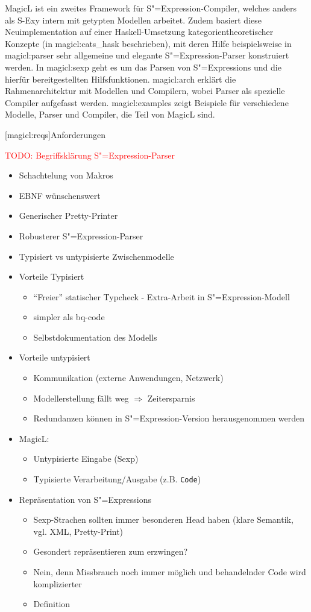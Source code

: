 \documentclass[a4paper, bibgerm]{book}
\newcommand\icode[1]{\lstinline?#1?}
\newcommand{\todo}[1]{
  \textcolor{red}{TODO: #1}
}
\newcommand\lsection{}
\newcommand\sref{}
\newcommand{\sexy}{S-Exy}
\newcommand{\sexp}{S"=Expression}
\newcommand{\sexps}{S"=Expressions}
\begin{document}
MagicL ist ein zweites Framework für \sexp-Compiler, welches anders
als \sexy{} intern mit getypten Modellen arbeitet. Zudem basiert diese
Neuimplementation auf einer Haskell-Umsetzung kategorientheoretischer
Konzepte (in \sref{magicl:cats_hask} beschrieben), mit deren Hilfe
beispielsweise in \sref{magicl:parser} sehr allgemeine und elegante
\sexp{}-Parser konstruiert werden. In \sref{magicl:sexp} geht es um
das Parsen von \sexps{} und die hierfür bereitgestellten
Hilfsfunktionen. \sref{magicl:arch} erklärt die Rahmenarchitektur mit
Modellen und Compilern, wobei Parser als spezielle Compiler aufgefasst
werden. \sref{magicl:examples} zeigt Beispiele für verschiedene
Modelle, Parser und Compiler, die Teil von MagicL sind.

\lsection[magicl:reqs]{Anforderungen}

\todo{Begriffsklärung \sexp{}-Parser}

\begin{itemize}
\item Schachtelung von Makros
\item EBNF wünschenswert
\item Generischer Pretty-Printer
\item Robusterer \sexp-{Parser} 
\item Typisiert vs untypisierte Zwischenmodelle
\item Vorteile Typisiert
  \begin{itemize}
  \item "`Freier"' statischer Typcheck - Extra-Arbeit in \sexp{}-Modell
  \item simpler als bq-code
  \item Selbstdokumentation des Modells
  \end{itemize}
\item Vorteile untypisiert
  \begin{itemize}
  \item Kommunikation (externe Anwendungen, Netzwerk)
  \item Modellerstellung fällt weg $\Rightarrow$ Zeitersparnis
  \item Redundanzen können in \sexp{}-Version herausgenommen werden
  \end{itemize}
\item MagicL:
  \begin{itemize}
  \item Untypisierte Eingabe (Sexp)
  \item Typisierte Verarbeitung/Ausgabe (z.B. \icode{Code})
  \end{itemize}
\item Repräsentation von \sexps{}
  \begin{itemize}
  \item Sexp-Strachen sollten immer besonderen Head haben (klare
    Semantik, vgl. XML, Pretty-Print)
  \item Gesondert repräsentieren zum erzwingen?
  \item Nein, denn Missbrauch noch immer möglich und behandelnder Code
    wird komplizierter
  \item Definition
  \end{itemize}
\end{itemize}
\end{document}
